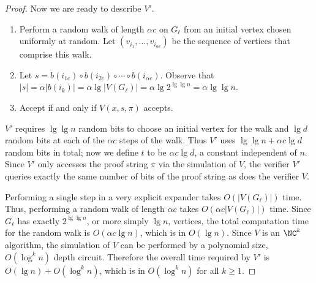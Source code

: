 \documentclass[]{article}
\begin{document}
\begin{proof}
  Now we are ready to describe $V'$.
  \begin{enumerate}
  \item
    Perform a random walk of length $\alpha c$ on $G_\ell$ from an initial vertex chosen uniformly at random.
    Let $(v_{i_1}, \dotsc, v_{i_{\alpha c}})$ be the sequence of vertices that comprise this walk.
  \item
    Let $s = b(i_{1c}) \circ b(i_{2c}) \circ \dotsb \circ b(i_{\alpha c})$.
    Observe that $|s| = \alpha |b(i_k)| = \alpha \lg |V(G_\ell)| = \alpha \lg 2^{\lg \lg n} = \alpha \lg \lg n$.
  \item Accept if and only if $V(x, s, \pi)$ accepts.
  \end{enumerate}
  $V'$ requires $\lg \lg n$ random bits to choose an initial vertex for the walk and $\lg d$ random bits at each of the $\alpha c$ steps of the walk.
  Thus $V'$ uses $\lg \lg n + \alpha c \lg d$ random bits in total; now we define $t$ to be $\alpha c \lg d$, a constant independent of $n$.
  Since $V'$ only accesses the proof string $\pi$ via the simulation of $V$, the verifier $V'$ queries exactly the same number of bits of the proof string as does the verifier $V$.

  Performing a single step in a very explicit expander takes $O(|V(G_\ell)|)$ time.
  Thus, performing a random walk of length $\alpha c$ takes $O(\alpha c |V(G_\ell)|)$ time.
  Since $G_\ell$ has exactly $2^{\lg \lg n}$, or more simply $\lg n$, vertices, the total computation time for the random walk is $O(\alpha c \lg n)$, which is in $O(\lg n)$.
  Since $V$ is an $\NC^k$ algorithm, the simulation of $V$ can be performed by a polynomial size, $O(\log^k n)$ depth circuit.
  Therefore the overall time required by $V'$ is $O(\lg n) + O(\log^k n)$, which is in $O(\log^k n)$ for all $k \geq 1$.


\end{proof}
\end{document}
